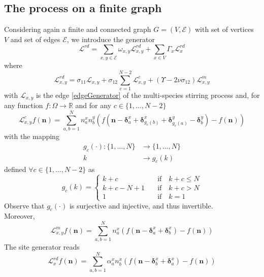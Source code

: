 \documentclass[11pt]{article}
\numberwithin{equation}{section}
\numberwithin{equation}{subsection}
\begin{document}
\subsection{The process on a finite graph}
Considering again a finite and connected graph $G=(V,\mathcal{E})$ with set of vertices $V$ and set of edges $\mathcal{E}$, we introduce the generator
\begin{equation}\label{RDGenerator}
	\mathcal{L}^{rd}=\sum_{x,y\in\mathcal{E}}\omega_{x,y}\mathcal{L}_{x,y}^{rd}+\sum_{x\in V}\Gamma_{x}\mathcal{L}_{x}^{rd}
\end{equation}
where
\begin{equation}\label{edgeGeneratorRD}
	\mathcal{L}_{x,y}^{rd}=\sigma_{11}\mathcal{L}_{x,y}+\sigma_{12}\sum_{c=1}^{N-2}\mathcal{L}_{x,y}^{c}+(\Upsilon-2\nu\sigma_{12})\mathcal{L}_{x,y}^{m}
\end{equation}
with $\mathcal{L}_{x,y}$ is the edge \eqref{edgeGenerator} of the multi-species stirring process and, for any function $f:\Omega\to \mathbb{R}$ and for any $c\in \{1,\ldots,N-2\}$
\begin{equation}
	\mathcal{L}_{x,y}^{c}f(\bm{n})=\sum_{a,b=1}^{N}n_{a}^{x}n_{b}^{y}\left(f(\bm{n}-\bm{\delta}_{a}^{x}+\bm{\delta}_{g_{c}(b)}^{x}+\bm{\delta}_{g_{c}(a)}^{y}-\bm{\delta}_{b}^{y})-f(\bm{n})\right)
\end{equation}
with the mapping 
\begin{equation}
	\begin{split}
		g_{c}(\cdot):\{1,\ldots,N\}&\to\{1,\ldots,N\}\\
		k&\to g_{c}(k)
	\end{split}
\end{equation}
defined $\forall c\in\{1,\ldots,N-2\}$ as 
\begin{equation}
	g_{c}(k)=\begin{cases}
		k+c \quad &\text{if}\quad k+c\leq N\\
		k+c-N+1\quad &\text{if}\quad k+c>N\\
		1\quad &\text{if}\quad k=1
	\end{cases}
\end{equation}
Observe that $g_{c}(\cdot)$ is surjective and injective, and thus invertible. \\
Moreover,
\begin{equation}
	\mathcal{L}_{x,y}^{m}f(\bm{n})=\sum_{a,b=1}^{N}n_{a}^{x}\left(f(\bm{n}-\bm{\delta}_{a}^{x}+\bm{\delta}_{b}^{x})-f(\bm{n})\right)
\end{equation}
The site generator reads
\begin{equation}
	\mathcal{L}_{x}^{rd}f(\bm{n})=\sum_{a,b=1}^{N}\alpha_{a}^{x}n_{b}^{x}\left(f(\bm{n}-\bm{\delta}_{b}^{x}+\bm{\delta}_{a}^{x})-f(\bm{n})\right)
\end{equation}
\end{document}
